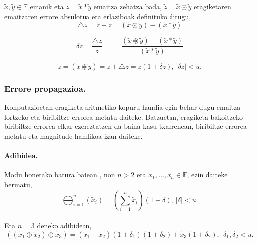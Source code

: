 $\tilde x,\tilde y \in \mathbb{F}$ emanik eta $z= \tilde x \ast \tilde y$ emaitza zehatza bada, $\tilde z= \tilde x \circledast \tilde y$ eragiketaren emaitzaren errore absulotua eta erlaziboak definituko ditugu,
\begin{equation*}
\triangle z=\tilde z-z =(\tilde x \circledast \tilde y) -(\tilde x \ast \tilde y)
\end{equation*} 

\begin{equation*}
\delta z=\frac{\triangle z}{z}==\frac{(\tilde x \circledast \tilde y) -(\tilde x \ast \tilde y)}{(\tilde x \ast \tilde y)}
\end{equation*} 

\begin{equation*}
\tilde z=(\tilde x \circledast \tilde y)=z+\triangle z=z(1+\delta z), \ |\delta z|<u. 
\end{equation*}

\subsubsection*{Errore propagazioa.}

Konputazioetan eragiketa aritmetiko kopuru handia egin behar dugu emaitza lortzeko eta biribiltze errorea metatu daiteke. Batzuetan, eragiketa bakoitzeko biribiltze errorea elkar ezereztatzen da baina kasu txarrenean, biribiltze errorea metatu eta magnitude handikoa izan daiteke.   

\paragraph*{\textbf{Adibidea}.} 
Modu honetako batura batean , non $n>2$ eta $\tilde x_1,\dots,\tilde x_n \in \mathbb{F}$,  ezin daiteke bermatu,  
\begin{equation*}
\bigoplus_{i=1}^{n}(\tilde x_i)=(\sum\limits_{i=1}^{n} \tilde x_i)(1+\delta), \ |\delta|<u.
\end{equation*}

\paragraph*{}Eta $n=3$ deneko adibidean,
\begin{equation*}
((\tilde x_1 \oplus \tilde x_2) \oplus \tilde x_3)  = 
  (\tilde x_1 + \tilde x_2)(1+\delta_1)(1+\delta_2)
  +\tilde x_3 (1+\delta_2), \ \ \delta_1,\delta_2<u.
\end{equation*}

